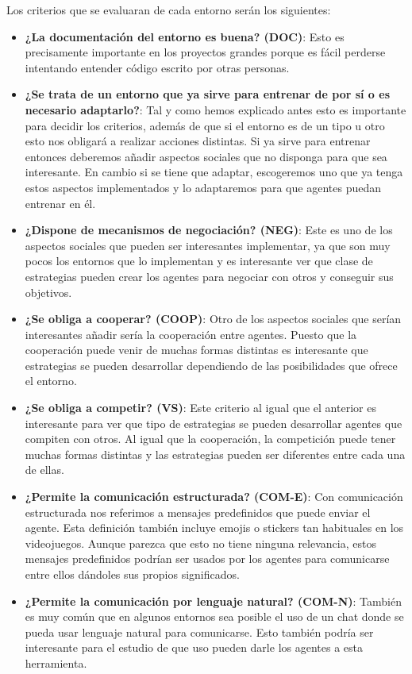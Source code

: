 Los criterios que se evaluaran de cada entorno serán los siguientes:
\begin{itemize}
    \item \textbf{¿La documentación del entorno es buena? (DOC)}: Esto es precisamente importante en los proyectos grandes porque es fácil perderse intentando entender código escrito por otras personas.
    \item \textbf{¿Se trata de un entorno que ya sirve para entrenar de por sí o es necesario adaptarlo?}: Tal y como hemos explicado antes esto es importante para decidir los criterios, además de que si el entorno es de un tipo u otro esto nos obligará a realizar acciones distintas. Si ya sirve para entrenar entonces deberemos añadir aspectos sociales que no disponga para que sea interesante. En cambio si se tiene que adaptar, escogeremos uno que ya tenga estos aspectos implementados y lo adaptaremos para que agentes puedan entrenar en él.
    \item \textbf{¿Dispone de mecanismos de negociación? (NEG)}: Este es uno de los aspectos sociales que pueden ser interesantes implementar, ya que son muy pocos los entornos que lo implementan y es interesante ver que clase de estrategias pueden crear los agentes para negociar con otros y conseguir sus objetivos.
    \item \textbf{¿Se obliga a cooperar? (COOP)}: Otro de los aspectos sociales que serían interesantes añadir sería la cooperación entre agentes. Puesto que la cooperación puede venir de muchas formas distintas es interesante que estrategias se pueden desarrollar dependiendo de las posibilidades que ofrece el entorno.
    \item \textbf{¿Se obliga a competir? (VS)}: Este criterio al igual que el anterior es interesante para ver que tipo de estrategias se pueden desarrollar agentes que compiten con otros. Al igual que la cooperación, la competición puede tener muchas formas distintas y las estrategias pueden ser diferentes entre cada una de ellas.
    \item \textbf{¿Permite la comunicación estructurada? (COM-E)}: Con comunicación estructurada nos referimos a mensajes predefinidos que puede enviar el agente. Esta definición también incluye emojis o stickers tan habituales en los videojuegos. Aunque parezca que esto no tiene ninguna relevancia, estos mensajes predefinidos podrían ser usados por los agentes para comunicarse entre ellos dándoles sus propios significados.
    \item \textbf{¿Permite la comunicación por lenguaje natural? (COM-N)}: También es muy común que en algunos entornos sea posible el uso de un chat donde se pueda usar lenguaje natural para comunicarse. Esto también podría ser interesante para el estudio de que uso pueden darle los agentes a esta herramienta.

\end{itemize}
